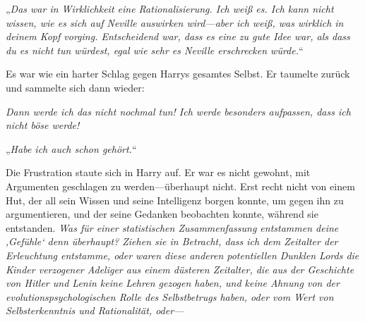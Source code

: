 „\emph{Das war in Wirklichkeit eine Rationalisierung. Ich weiß es. Ich kann nicht wissen, wie es sich auf Neville auswirken wird—aber ich weiß, was wirklich in deinem Kopf vorging. Entscheidend war, dass es eine zu gute Idee war, als dass du es \emph{nicht} tun würdest, egal wie sehr es Neville erschrecken würde.}“

Es war wie ein harter Schlag gegen Harrys gesamtes Selbst. Er taumelte zurück und sammelte sich dann wieder:

\emph{Dann werde ich das nicht nochmal tun! Ich werde besonders aufpassen, dass ich nicht böse werde! }

„\emph{Habe ich auch schon gehört.}“

Die Frustration staute sich in Harry auf. Er war es nicht gewohnt, mit Argumenten geschlagen zu werden—überhaupt nicht. Erst recht nicht von einem Hut, der all sein Wissen und seine Intelligenz borgen konnte, um gegen ihn zu argumentieren, und der seine Gedanken beobachten konnte, während sie entstanden. \emph{Was für einer statistischen Zusammenfassung entstammen deine ‚Gefühle‘ denn überhaupt? Ziehen sie in Betracht, dass ich dem Zeitalter der Erleuchtung entstamme, oder waren diese anderen potentiellen Dunklen Lords die Kinder verzogener Adeliger aus einem düsteren Zeitalter, die aus der Geschichte von Hitler und Lenin keine Lehren gezogen haben, und keine Ahnung von der evolutionspsychologischen Rolle des Selbstbetrugs haben, oder vom Wert von Selbsterkenntnis und Rationalität, oder—}

